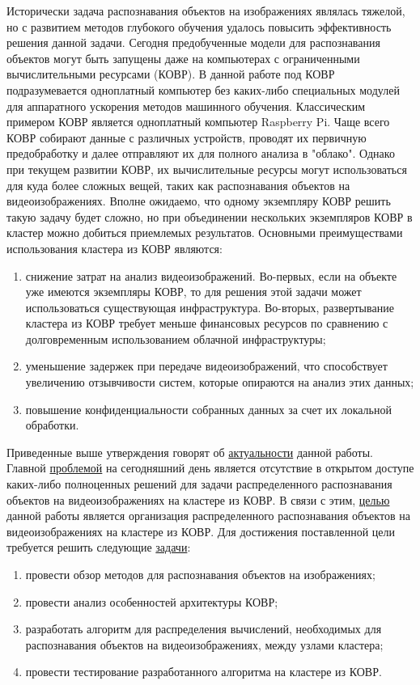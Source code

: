 Исторически задача распознавания объектов на изображениях являлась тяжелой, но с развитием методов глубокого обучения удалось 
повысить эффективность решения данной задачи. Сегодня предобученные модели для распознавания объектов могут быть запущены даже 
на компьютерах с ограниченными вычислительными ресурсами (КОВР). В данной работе под КОВР подразумевается одноплатный компьютер 
без каких-либо специальных модулей для аппаратного ускорения методов машинного обучения. Классическим примером КОВР является одноплатный
компьютер Raspberry Pi. Чаще всего КОВР собирают данные с различных устройств, проводят их первичную предобработку и далее отправляют
их для полного анализа в "облако". Однако при текущем развитии КОВР, их вычислительные ресурсы могут использоваться для куда более
сложных вещей, таких как распознавания объектов на видеоизображениях. Вполне ожидаемо, что одному экземпляру КОВР решить 
такую задачу будет сложно, но при объединении нескольких экземпляров КОВР в кластер можно добиться приемлемых результатов. 
Основными преимуществами использования кластера из КОВР являются:

\begin{enumerate}
\item снижение затрат на анализ видеоизображений. Во-первых, если на объекте уже имеются экземпляры КОВР, 
то для решения этой задачи может использоваться существующая инфраструктура. Во-вторых, развертывание кластера из КОВР
требует меньше финансовых ресурсов по сравнению с долговременным использованием облачной инфраструктуры; 
\item уменьшение задержек при передаче видеоизображений, что способствует увеличению отзывчивости систем, которые 
опираются на анализ этих данных; 
\item повышение конфиденциальности собранных данных за счет их локальной обработки.
\end{enumerate}

Приведенные выше утверждения говорят об \underline{актуальности} данной работы. Главной \underline{проблемой} на сегодняшний день 
является отсутствие в открытом доступе каких-либо полноценных решений для задачи распределенного распознавания объектов на 
видеоизображениях на кластере из КОВР. В связи с этим, \underline{целью} данной работы является организация распределенного 
распознавания объектов на видеоизображениях на кластере из КОВР. Для достижения поставленной цели требуется решить 
следующие \underline{задачи}:

\begin{enumerate}
\item провести обзор методов для распознавания объектов на изображениях;
\item провести анализ особенностей архитектуры КОВР;
\item разработать алгоритм для распределения вычислений, необходимых для распознавания объектов на видеоизображениях, 
между узлами кластера;
\item провести тестирование разработанного алгоритма на кластере из КОВР.
\end{enumerate}

\clearpage
